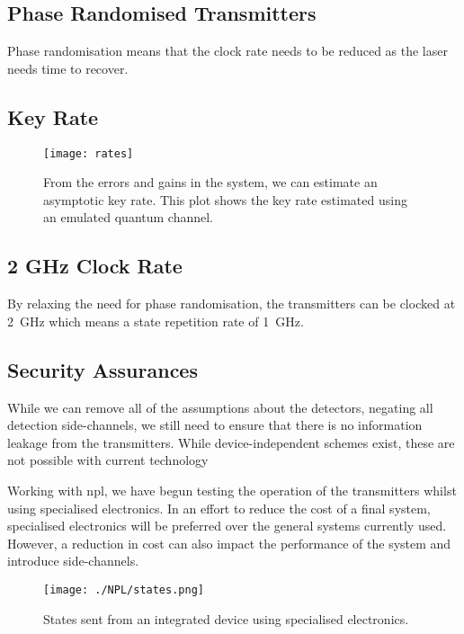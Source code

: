 \subsection{Phase Randomised Transmitters}

Phase randomisation means that the clock rate needs to be reduced as the laser needs time to recover. 

\subsection{Key Rate}

\begin{figure}
	\centering
	\texttt{[image: rates]}
	\caption[Asymptotic key rates of chip-based MDI-QKD]{From the errors and gains in the system, we can estimate an asymptotic key rate. This plot shows the key rate estimated using an emulated quantum channel.}
	\label{fig:mdi_rates}
\end{figure}

\subsection{2 GHz Clock Rate}

By relaxing the need for phase randomisation, the transmitters can be clocked at \SI{2}{GHz} which means a state repetition rate of \SI{1}{GHz}.

\subsection{Security Assurances}

While we can remove all of the assumptions about the detectors, negating all detection side-channels, we still need to ensure that there is no information leakage from the transmitters. While device-independent schemes exist, these are not possible with current technology

Working with \ac{npl}, we have begun testing the operation of the transmitters whilst using specialised electronics. In an effort to reduce the cost of a final system, specialised electronics will be preferred over the general systems currently used. However, a reduction in cost can also impact the performance of the system and introduce side-channels.

\begin{figure}
	\texttt{[image: ./NPL/states.png]}
	\caption{States sent from an integrated device using specialised electronics.}
	\label{fig:npl_states}
\end{figure}

